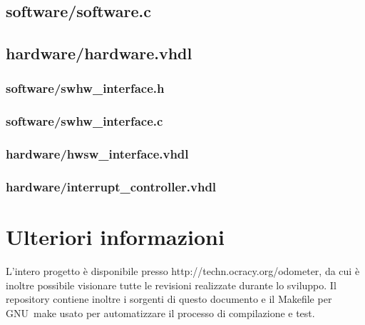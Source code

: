 \documentclass [11pt,a4paper,oneside]{article}
\newcommand{\href}[2]{#2}
\newcommand{\link}[1]{\href{#1}{#1}}
\begin{document}
\subsection{software/software.c}


\subsection{hardware/hardware.vhdl}


\subsubsection{software/swhw\_interface.h}


\subsubsection{software/swhw\_interface.c}


\subsubsection{hardware/hwsw\_interface.vhdl}


\subsubsection{hardware/interrupt\_controller.vhdl}



\section{Ulteriori informazioni}
L'intero progetto è disponibile presso \link{http://techn.ocracy.org/odometer}, da cui
è inoltre possibile visionare tutte le revisioni realizzate durante lo sviluppo.
Il repository contiene inoltre i sorgenti di questo documento e il Makefile
per GNU~make usato per automatizzare il processo di compilazione e test.
\end{document}
